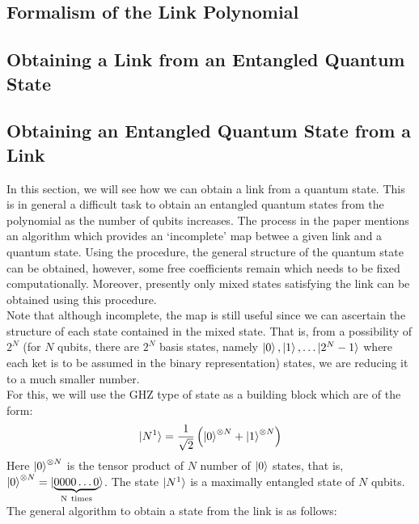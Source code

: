 \documentclass{scrartcl}
\begin{document}
\subsection{Formalism of the Link Polynomial}
\subsection{Obtaining a Link from an Entangled Quantum State}\label{link_from_state}

\subsection{Obtaining an Entangled Quantum State from a Link}\label{state_from_link}
In this section, we will see how we can obtain a link from a quantum state. This is in general a difficult task to obtain an entangled quantum states from the polynomial as the number of qubits increases. The process in the paper mentions an algorithm which provides an `incomplete' map betwee a given link and a quantum state. Using the procedure, the general structure of the quantum state can be obtained, however, some free coefficients remain which needs to be fixed computationally. Moreover, presently only mixed states satisfying the link can be obtained using this procedure. \\[0.3cm]
Note that although incomplete, the map is still useful since we can ascertain the structure of each state contained in the mixed state. That is, from a possibility of $2^N$ (for $N$ qubits, there are $2^N$ basis states, namely $\ket{0}, \ket{1}, \ldots \ket{2^N-1}$ where each ket is to be assumed in the binary representation) states, we are reducing it to a much smaller number. \\[0.3cm]
For this, we will use the GHZ type of state as a building block which are of the form:
\begin{align*}
    \ket{N^1} = \frac{1}{\sqrt{2}}\left( \ket{0}^{\otimes N} + \ket{1}^{\otimes N} \right) \\
\end{align*}
Here $\ket{0}^{\otimes N}$ is the tensor product of $N$ number of $\ket{0}$ states, that is, $\ket{0}^{\otimes N} = \ket{\underbrace{0000\ldots0}_{\mathrm{N\ times}}}$. The state $\ket{N^1}$ is a maximally entangled state of $N$ qubits. The general algorithm to obtain a state from the link is as follows:
\end{document}
